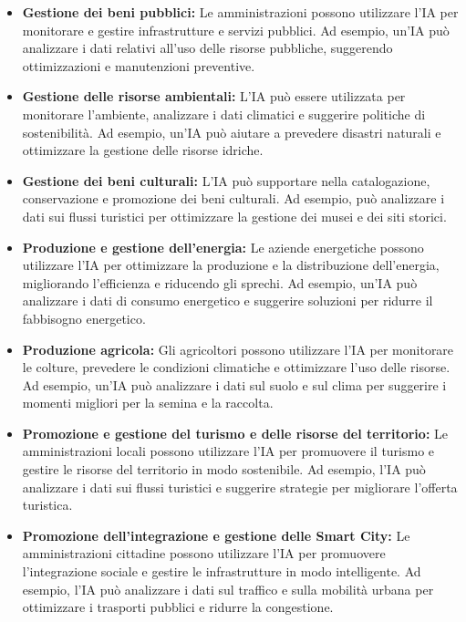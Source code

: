     \begin{itemize}
        \item \textbf{Gestione dei beni pubblici:} Le amministrazioni possono utilizzare l'IA per monitorare e gestire infrastrutture e servizi pubblici. Ad esempio, un'IA può analizzare i dati relativi all'uso delle risorse pubbliche, suggerendo ottimizzazioni e manutenzioni preventive. 

        \item \textbf{Gestione delle risorse ambientali:} L'IA può essere utilizzata per monitorare l'ambiente, analizzare i dati climatici e suggerire politiche di sostenibilità. Ad esempio, un'IA può aiutare a prevedere disastri naturali e ottimizzare la gestione delle risorse idriche. 
        
        \item \textbf{Gestione dei beni culturali:} L'IA può supportare nella catalogazione, conservazione e promozione dei beni culturali. Ad esempio, può analizzare i dati sui flussi turistici per ottimizzare la gestione dei musei e dei siti storici. 
        
        \item \textbf{Produzione e gestione dell'energia:} Le aziende energetiche possono utilizzare l'IA per ottimizzare la produzione e la distribuzione dell'energia, migliorando l'efficienza e riducendo gli sprechi. Ad esempio, un'IA può analizzare i dati di consumo energetico e suggerire soluzioni per ridurre il fabbisogno energetico. 
        
        \item \textbf{Produzione agricola:} Gli agricoltori possono utilizzare l'IA per monitorare le colture, prevedere le condizioni climatiche e ottimizzare l'uso delle risorse. Ad esempio, un'IA può analizzare i dati sul suolo e sul clima per suggerire i momenti migliori per la semina e la raccolta. 
        
        \item \textbf{Promozione e gestione del turismo e delle risorse del territorio:} Le amministrazioni locali possono utilizzare l'IA per promuovere il turismo e gestire le risorse del territorio in modo sostenibile. Ad esempio, l'IA può analizzare i dati sui flussi turistici e suggerire strategie per migliorare l'offerta turistica. 
        
        \item \textbf{Promozione dell'integrazione e gestione delle Smart City:} Le amministrazioni cittadine possono utilizzare l'IA per promuovere l'integrazione sociale e gestire le infrastrutture in modo intelligente. Ad esempio, l'IA può analizzare i dati sul traffico e sulla mobilità urbana per ottimizzare i trasporti pubblici e ridurre la congestione. 
    \end{itemize}

